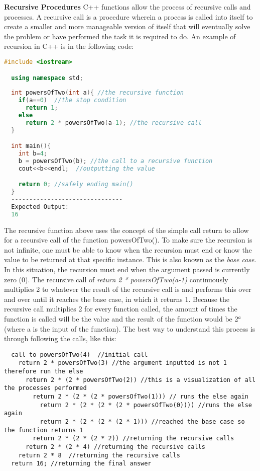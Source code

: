 \documentclass[12pt]{article}
\begin{document}
\textbf{Recursive Procedures} C++ functions allow the process of recursive calls and processes. A recursive call is a procedure wherein a process is called into itself to create a smaller and more manageable version of itself that will eventually solve the problem or have performed the task it is required to do. An example of recursion in C++ is in the following code:

\begin{lstlisting}[language=C++]
  #include <iostream>

  using namespace std;
  
  int powersOfTwo(int a){ //the recursive function
    if(a==0)  //the stop condition
      return 1;
    else
      return 2 * powersOfTwo(a-1); //the recursive call
  }

  int main(){
    int b=4;
    b = powersOfTwo(b); //the call to a recursive function
    cout<<b<<endl;  //outputting the value 

    return 0; //safely ending main()
  }
  -------------------------------
  Expected Output:
  16
\end{lstlisting}
The recursive function above uses the concept of the simple call return to allow for a recursive call of the function powersOfTwo(). To make sure the recursion is not infinite, one must be able to know when the recursion must end or know the value to be returned at that specific instance. This is also known as the \textit{base case}. In this situation, the recursion must end when the argument passed is currently zero (0). The recursive call of \textit{return 2 * powersOfTwo(a-1)} continuously multiplies 2 to whatever the result of the recursive call is and performs this over and over until it reaches the base case, in which it returns 1. Because the recursive call multiplies 2 for every function called, the amount of times the function is called will be the value and the result of the function would be 2$^a$ (where a is the input of the function). The best way to understand this process is through following the calls, like this:
\begin{lstlisting}
  call to powersOfTwo(4)  //initial call
    return 2 * powersOfTwo(3) //the argument inputted is not 1 therefore run the else
      return 2 * (2 * powersOfTwo(2)) //this is a visualization of all the processes performed
        return 2 * (2 * (2 * powersOfTwo(1))) // runs the else again
          return 2 * (2 * (2 * (2 * powersOfTwo(0)))) //runs the else again
          return 2 * (2 * (2 * (2 * 1))) //reached the base case so the function returns 1
        return 2 * (2 * (2 * 2)) //returning the recursive calls
      return 2 * (2 * 4) //returning the recursive calls
    return 2 * 8  //returning the recursive calls
  return 16; //returning the final answer
\end{lstlisting}
\end{document}
